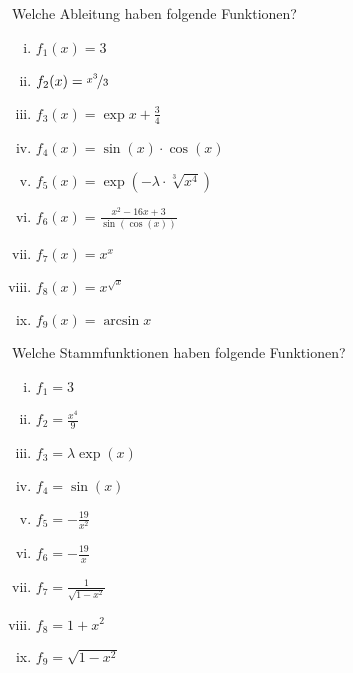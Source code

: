 \begin{Exercise}[label = devsandints, title = Ableit - und Integrierspaß]
	\Question
	Welche Ableitung haben folgende Funktionen?
	\begin{multicols}{3}
		\begin{enumerate}[(i)]
			\item $f_1(x) = 3$
 			\item $f_2(x)= \nicefrac{x^3}{3}$
			\item $f_3(x) = \exp x + \frac{3}{4}$
			\item $f_4(x) = \sin(x)\cdot\cos(x)$
			\item $f_5(x) = \exp(-\lambda\cdot \sqrt[3]{x^4})$
			\item $f_6(x) = \frac{x^2-16x+3}{\sin\left(\cos\left(x\right)\right)}$
			\item $f_7(x) = x^x$
			\item $f_8(x) = x^{\sqrt{x}}$
			\item $f_9(x) = \arcsin{x}$
		\end{enumerate}
	\end{multicols}
	\Question
	Welche Stammfunktionen haben folgende Funktionen?
	\begin{multicols}{3}
		\begin{enumerate}[(i)]
			\item $f_1 = 3$
			\item $f_2 = \frac{x^4}{9}$
			\item $f_3 = \lambda \exp(x)$
			\item $f_4 = \sin\left(x\right)$
			\item $f_5 = -\frac{19}{x^2}$
			\item $f_6 = -\frac{19}{x}$
			\item $f_7 = \frac{1}{\sqrt{1-x^2}}$
			\item $f_8 = 1+x^2$
			\item $f_9 = \sqrt{1-x^2}$
			
		\end{enumerate}
	\end{multicols}
\end{Exercise}
